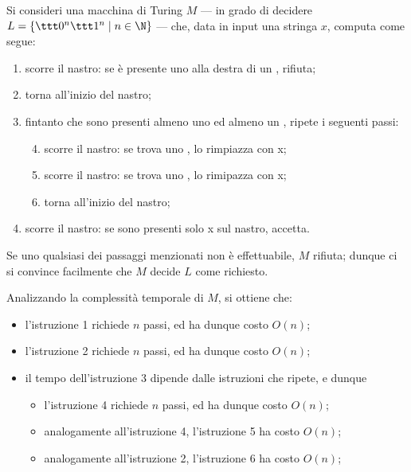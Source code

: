 \documentclass[a4paper, 12pt]{report}
\begin{document}
    \begin{example}
        Si consideri una macchina di Turing $M$ --- in grado di decidere $L= \{\ttt 0 ^n \ttt 1 ^n \mid n \in \N\}$ --- che, data in input una stringa $x$, computa come segue: 

        \begin{enumerate}
            \item scorre il nastro: se è presente uno  alla destra di un , rifiuta;
            \item torna all'inizio del nastro;
            \item fintanto che sono presenti almeno uno  ed almeno un , ripete i seguenti passi:
                \begin{enumerate}[label=\arabic*.]
                    \setcounter{enumii}{3}
                    \setcounter{enumi}{6}
                    \item scorre il nastro: se trova uno , lo rimpiazza con \ttt x;
                    \item scorre il nastro: se trova uno , lo rimipazza con \ttt x;
                    \item torna all'inizio del nastro;
                \end{enumerate}
            \item scorre il nastro: se sono presenti solo \ttt x sul nastro, accetta.
        \end{enumerate}

        Se uno qualsiasi dei passaggi menzionati non è effettuabile, $M$ rifiuta; dunque ci si convince facilmente che $M$ decide $L$ come richiesto.

        Analizzando la complessità temporale di $M$, si ottiene che:

        \begin{itemize}
            \item l'istruzione 1 richiede $n$ passi, ed ha dunque costo $O(n)$;
            \item l'istruzione 2 richiede $n$ passi, ed ha dunque costo $O(n)$;
            \item il tempo dell'istruzione 3 dipende dalle istruzioni che ripete, e dunque

                \begin{itemize}
                    \item l'istruzione 4 richiede $n$ passi, ed ha dunque costo $O(n)$;
                    \item analogamente all'istruzione 4, l'istruzione 5 ha costo $O(n)$;
                    \item analogamente all'istruzione 2, l'istruzione 6 ha costo $O(n)$;
                \end{itemize}


\end{itemize}
\end{example}
\end{document}
